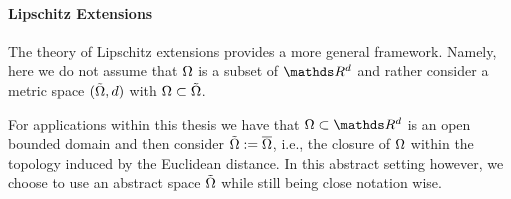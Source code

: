 \paragraph{Lipschitz Extensions}
%
The theory of Lipschitz extensions provides a more general framework. Namely, here we do not assume that $\Omega$ is a subset of 
$\R^d$ and rather consider a metric space $(\tilde{\Omega},d)$ with $\Omega\subset \tilde{\Omega}$. 
%
\begin{remark}{}{}
For applications within this thesis we have that $\domain\subset\R^d$ is an open bounded domain and then consider 
$\tilde{\Omega}:= \overline{\Omega}$, i.e., the closure of $\Omega$ within the topology induced by the Euclidean distance. 
In this abstract setting however, we choose to use an abstract space $\tilde{\Omega}$ while still being close notation wise.
\end{remark}
%

